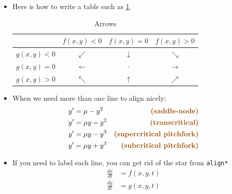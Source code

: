 \documentclass{worksheet}
\begin{document}
    \begin{itemize} %
    
    
            
    \item Here is how to write a table such as \cref{table:arrows}.
    
     
    \begin{table}[!ht]
            \renewcommand{\arraystretch}{1.5} %
            \centering
            \begin{tabular}{c|c|c|c|}
            {} & $f(x,y)<0$ & $f(x,y)=0$ & $f(x,y)>0$  \\
            \hline
            $g(x,y)<0$ & $\swarrow$ & $\downarrow$ & $\searrow$ \\
            \hline
            $g(x,y)=0$ & $\leftarrow$ & $\cdot$ & $\rightarrow$ \\
            \hline
            $g(x,y)>0$ & $\nwarrow$ & $\uparrow$ & $\nearrow$ \\
            \hline
            \end{tabular}
            \caption{Arrows}
            \label{table:arrows}
    \end{table}
    
    \item  When we need more than one line to align nicely:
           	\begin{align*}
        	    y' &= \mu - y^2 &\text{\em (saddle-node)}\\ %
        	    y' &= \mu y - y^2 &\text{\em (transcritical)}\\
        	    y' &= \mu y -y^3 &\text{\em (supercritical pitchfork)}\\
        	    y' &= \mu y +y^3 &\text{\em (subcritical pitchfork)}
        	\end{align*}

    
    \item If you need to label each line, you can get rid of the star from {\tt align*}
            \begin{align}
                \frac{dx}{dt} &= f(x,y,t) \\ 
        	    \frac{dy}{dt} &= g(x,y,t)
            \end{align}
    

\end{itemize}
\end{document}
